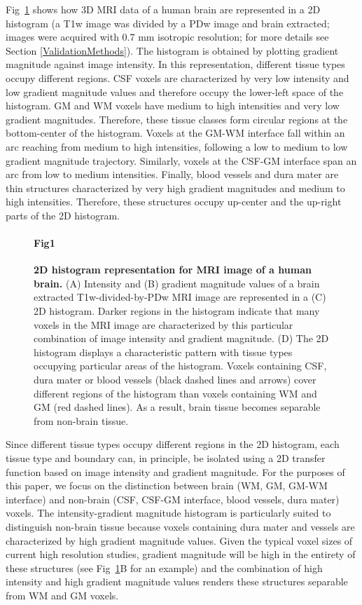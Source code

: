 Fig~\ref{Fig1} shows how 3D MRI data of a human brain are represented in a 2D histogram (a T1w image was divided by a PDw image \cite{Moortele2009} and brain extracted; images were acquired with 0.7 mm isotropic resolution; for more details see Section \ref{ValidationMethods}). The histogram is obtained by plotting gradient magnitude against image intensity. In this representation, different tissue types occupy different regions. CSF voxels are characterized by very low intensity and low gradient magnitude values and therefore occupy the lower-left space of the histogram. GM and WM voxels have medium to high intensities and very low gradient magnitudes. Therefore, these tissue classes form circular regions at the bottom-center of the histogram. Voxels at the GM-WM interface fall within an arc reaching from medium to high intensities, following a low to medium to low gradient magnitude trajectory. Similarly, voxels at the CSF-GM interface span an arc from low to medium intensities. Finally, blood vessels and dura mater are thin structures characterized by very high gradient magnitudes and medium to high intensities. Therefore, these structures occupy up-center and the up-right parts of the 2D histogram.


\begin{figure}[!ht]
\paragraph{Fig1}
\caption{{\bf 2D histogram representation for MRI image of a human brain.}
(A) Intensity and (B) gradient magnitude values of a brain extracted T1w-divided-by-PDw MRI image are represented in a (C) 2D histogram. Darker regions in the histogram indicate that many voxels in the MRI image are characterized by this particular combination of image intensity and gradient magnitude. (D) The 2D histogram displays a characteristic pattern with tissue types occupying particular areas of the histogram. Voxels containing CSF, dura mater or blood vessels (black dashed lines and arrows) cover different regions of the histogram than voxels containing WM and GM (red dashed lines). As a result, brain tissue becomes separable from non-brain tissue.}
\label{Fig1}
\end{figure}

Since different tissue types occupy different regions in the 2D histogram, each tissue type and boundary can, in principle, be isolated using a 2D transfer function based on image intensity and gradient magnitude. For the purposes of this paper, we focus on the distinction between brain (WM, GM, GM-WM interface) and non-brain (CSF, CSF-GM interface, blood vessels, dura mater) voxels. The intensity-gradient magnitude histogram is particularly suited to distinguish non-brain tissue because voxels containing dura mater and vessels are characterized by high gradient magnitude values. Given the typical voxel sizes of current high resolution studies, gradient magnitude will be high in the entirety of these structures (see Fig~\ref{Fig1}B for an example) and the combination of high intensity and high gradient magnitude values renders these structures separable from WM and GM voxels.

